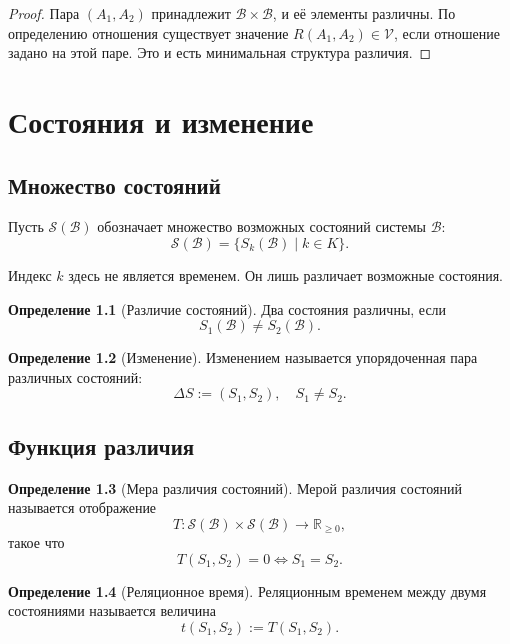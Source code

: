 \documentclass[12pt,a4paper,oneside]{book}
\theoremstyle{definition}
\newtheorem{definition}{Определение}[chapter]
\theoremstyle{plain}
\theoremstyle{remark}
\newcommand{\SubParts}{\mathcal B}
\newcommand{\Rel}{R}
\newcommand{\State}{S}
\newcommand{\States}{\mathcal S}
\newcommand{\Values}{\mathcal V}
\begin{document}
\begin{proof}
Пара \((A_1,A_2)\) принадлежит \(\SubParts\times\SubParts\), и её элементы различны. По определению отношения существует значение \(\Rel(A_1,A_2)\in\Values\), если отношение задано на этой паре. Это и есть минимальная структура различия.
\end{proof}

\chapter{Состояния и изменение}

\section{Множество состояний}

Пусть \(\States(\SubParts)\) обозначает множество возможных состояний системы \(\SubParts\):
\[
\States(\SubParts)=\{\State_k(\SubParts)\mid k\in K\}.
\]

Индекс \(k\) здесь не является временем. Он лишь различает возможные состояния.

\begin{definition}[Различие состояний]
Два состояния различны, если
\[
\State_1(\SubParts)\neq \State_2(\SubParts).
\]
\end{definition}

\begin{definition}[Изменение]
Изменением называется упорядоченная пара различных состояний:
\[
\Delta\State := (\State_1,\State_2),\quad \State_1\neq\State_2.
\]
\end{definition}

\section{Функция различия}

\begin{definition}[Мера различия состояний]
Мерой различия состояний называется отображение
\[
T:\States(\SubParts)\times\States(\SubParts)\to \mathbb R_{\ge 0},
\]
такое что
\[
T(\State_1,\State_2)=0 \iff \State_1=\State_2.
\]
\end{definition}

\begin{definition}[Реляционное время]
Реляционным временем между двумя состояниями называется величина
\[
t(\State_1,\State_2):=T(\State_1,\State_2).
\]
\end{definition}
\end{document}
